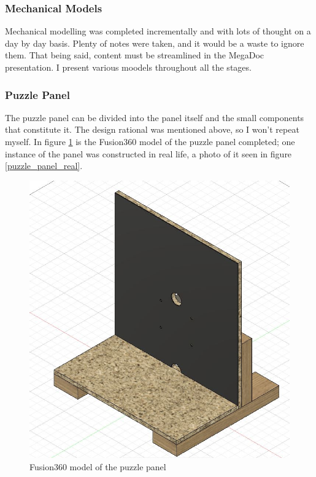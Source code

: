 \documentclass[a4paper, 10pt]{article}
\begin{document}
 		\subsubsection{Mechanical Models}
 		Mechanical modelling was completed incrementally and with lots of thought on a day by day basis. Plenty of notes were taken, and it would be a waste to ignore them. That being said, content must be streamlined in the MegaDoc presentation. I present various moodels throughout all the stages.
 		
 		\subsubsection*{Puzzle Panel}
		The puzzle panel can be divided into the panel itself and the small components that constitute it. The design rational was mentioned above, so I won't repeat myself. In figure \ref{puzzle_panel_model} is the Fusion360 model of the puzzle panel completed; one instance of the panel was constructed in real life, a photo of it seen in figure \ref{puzzle_panel_real}.
		
		\begin{figure} [h]
			\centering
			\includegraphics[scale=0.4]{Photos/puzzle_panel}
			\caption{Fusion360 model of the puzzle panel}
			\label{puzzle_panel_model}
		\end{figure}
		
\end{document}
